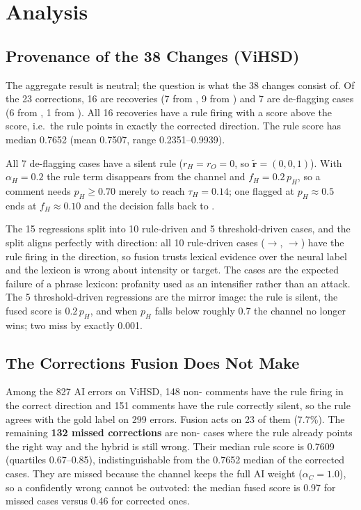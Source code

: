 \section{Analysis}
\label{sec:analysis}

\subsection{Provenance of the 38 Changes (ViHSD)}
\label{sec:provenance}

The aggregate result is neutral; the question is what the 38 changes consist of.
Of the 23 corrections, 16 are \hate{} recoveries (7 from \off{}, 9 from \clean{})
and 7 are \clean{} de-flagging cases (6 from \hate{}, 1 from \off{}).  All 16
\hate{} recoveries have a rule firing with a \hate{} score above the \off{}
score, i.e.\ the rule points in exactly the corrected direction.  The rule
\hate{} score has median 0.7652 (mean 0.7507, range 0.2351--0.9939).

All 7 \clean{} de-flagging cases have a silent rule ($r_H=r_O=0$, so
$\tilde{\mathbf r}=(0,0,1)$).  With $\alpha_H=0.2$ the rule term disappears from
the \hate{} channel and $f_H=0.2\,p_H$, so a comment needs $p_H\ge0.70$ merely
to reach $\tau_H=0.14$; one flagged \hate{} at $p_H\approx0.5$ ends at
$f_H\approx0.10$ and the decision falls back to \clean{}.

The 15 regressions split into 10 rule-driven and 5 threshold-driven cases, and
the split aligns perfectly with direction: all 10 rule-driven cases
(\off{}$\to$\hate{}, \clean{}$\to$\hate{}) have the rule firing in the \hate{}
direction, so fusion trusts lexical \hate{} evidence over the neural label and
the lexicon is wrong about intensity or target.  The \off{} cases are the
expected failure of a phrase lexicon: profanity used as an intensifier rather
than an attack.  The 5 threshold-driven regressions are the mirror image: the
rule is silent, the fused \hate{} score is $0.2\,p_H$, and when $p_H$ falls
below roughly 0.7 the \hate{} channel no longer wins; two miss by exactly
0.001.

\subsection{The Corrections Fusion Does Not Make}
\label{sec:missed_corrections}

Among the 827 AI errors on ViHSD, 148 non-\clean{} comments have the rule
firing in the correct direction and 151 \clean{} comments have the rule
correctly silent, so the rule agrees with the gold label on 299 errors.  Fusion
acts on 23 of them (7.7\%).  The remaining \textbf{132 missed corrections} are
non-\clean{} cases where the rule already points the right way and the hybrid
is still wrong.  Their median rule \hate{} score is 0.7609 (quartiles 0.67--0.85),
indistinguishable from the 0.7652 median of the corrected cases.  They are
missed because the \clean{} channel keeps the full AI weight ($\alpha_C=1.0$),
so a confidently wrong \clean{} cannot be outvoted: the median fused \clean{}
score is 0.97 for missed cases versus 0.46 for corrected ones.

